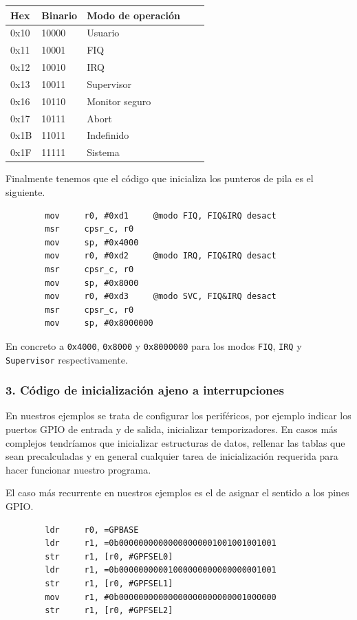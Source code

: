 \begin{longtable}{ p{1.8cm} | p{2cm} | p{5cm} | p{1cm} | p{1cm} }
\hline
{\bf Hex} & {\bf Binario} & {\bf Modo de operación} \\ \hline
0x10 & 10000 & Usuario        \\ \hline
0x11 & 10001 & FIQ            \\ \hline
0x12 & 10010 & IRQ            \\ \hline
0x13 & 10011 & Supervisor     \\ \hline
0x16 & 10110 & Monitor seguro \\ \hline
0x17 & 10111 & Abort          \\ \hline
0x1B & 11011 & Indefinido     \\ \hline
0x1F & 11111 & Sistema        \\ \hline
\end{longtable}

Finalmente tenemos que el código que inicializa los punteros de pila es el siguiente.

\begin{lstlisting}
        mov     r0, #0xd1     @modo FIQ, FIQ&IRQ desact
        msr     cpsr_c, r0
        mov     sp, #0x4000
        mov     r0, #0xd2     @modo IRQ, FIQ&IRQ desact
        msr     cpsr_c, r0
        mov     sp, #0x8000
        mov     r0, #0xd3     @modo SVC, FIQ&IRQ desact
        msr     cpsr_c, r0
        mov     sp, #0x8000000
\end{lstlisting}

En concreto a {\tt 0x4000}, {\tt 0x8000} y {\tt 0x8000000} para los modos {\tt FIQ}, {\tt IRQ} y
{\tt Supervisor} respectivamente.

\subsubsection{3. Código de inicialización ajeno a interrupciones}

En nuestros ejemplos se trata de configurar los periféricos, por ejemplo indicar los puertos
GPIO de entrada y de salida, inicializar temporizadores. En casos más complejos tendríamos que
inicializar estructuras de datos, rellenar las tablas que sean precalculadas y en general
cualquier tarea de inicialización requerida para hacer funcionar nuestro programa.

El caso más recurrente en nuestros ejemplos es el de asignar el sentido a los pines GPIO.

\begin{lstlisting}
        ldr     r0, =GPBASE
        ldr     r1, =0b00000000000000000001001001001001
        str     r1, [r0, #GPFSEL0]
        ldr     r1, =0b00000000001000000000000000001001
        str     r1, [r0, #GPFSEL1]
        mov     r1, #0b00000000000000000000000001000000
        str     r1, [r0, #GPFSEL2]
\end{lstlisting}

